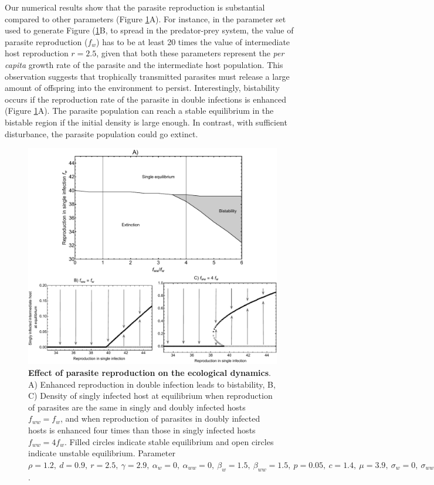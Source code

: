 \documentclass[a4paper]{scrartcl}
\begin{document}
Our numerical results show that the parasite reproduction is substantial compared to other parameters (Figure \ref{fig:bistability}A). 
For instance, in the parameter set used to generate Figure (\ref{fig:bistability}B, to spread in the predator-prey system, the value of parasite reproduction ($f_w$) has to be at least  20 times the value of intermediate host reproduction $r = 2.5$, given that both these parameters represent the \textit{per capita} growth rate of the parasite and the intermediate host population.
This observation suggests that trophically transmitted parasites must release a large amount of offspring into the environment to persist. 
Interestingly, bistability occurs if the reproduction rate of the parasite in double infections is enhanced (Figure \ref{fig:bistability}A). 
The parasite population can reach a stable equilibrium in the bistable region if the initial density is large enough. 
In contrast, with sufficient disturbance, the parasite population could go extinct.

\begin{figure}[!ht]
\captionsetup{format=plain}
\includegraphics[width = \textwidth]{Figures/reproduction_bifurcation.pdf}
\caption{\textbf{Effect of parasite reproduction on the ecological dynamics}. A) Enhanced reproduction in double infection leads to bistability, B, C) Density of singly infected host at equilibrium when reproduction of parasites are the same in singly and doubly infected hosts $f_{ww} = f_w$, and when reproduction of parasites in doubly infected hosts is enhanced four times than those in singly infected hosts $f_{ww} = 4 f_w$. Filled circles indicate stable equilibrium and open circles indicate unstable equilibrium. Parameter $\rho = 1.2, \  d = 0.9, \  r = 2.5, \ \gamma = 2.9, \ \alpha_w = 0, \ \alpha_{ww} =  0, \ \beta_w = 1.5, \ \beta_{ww} = 1.5, \ p = 0.05, \  c = 1.4, \ \mu = 3.9,  \ \sigma_w = 0, \ \sigma_{ww} = 0, \  q = 0.05, \ \delta = 0.9, \ k = 0.26, \ h = 0.6$.
}
\label{fig:bistability}
\end{figure}
\end{document}
